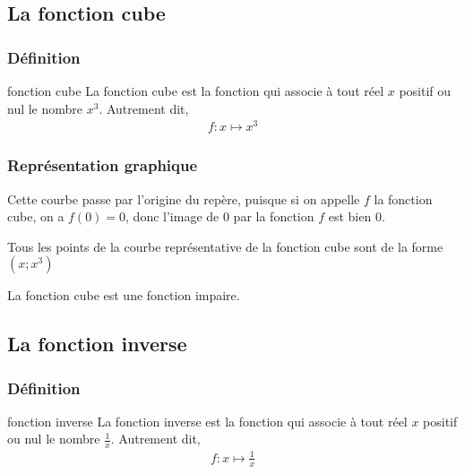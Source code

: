 \documentclass[11pt]{article}
\begin{document}
\subsection{La fonction cube}
\label{sec:org85f80e6}
\subsubsection{Définition}
\label{sec:orgffb8790}
\begin{defi}{fonction cube}
  La fonction cube est la fonction qui associe à tout réel $x$ positif
  ou nul le nombre $x^{3}$. Autrement dit,
  \begin{align*}
    f : x \mapsto x^{3}
  \end{align*}
\end{defi}
\subsubsection{Représentation graphique}
\label{sec:orgdcc5d09}
\begin{center}
\end{center}
\begin{prop}
  Cette courbe passe par l'origine du repère, puisque si on appelle $f$ la
  fonction cube, on a $f(0) = 0$, donc l'image de $0$ par la fonction $f$ est bien $0$.

  Tous les points de la courbe représentative de la fonction cube sont de la forme $(x; x^{3})$

  La fonction cube est une fonction impaire.
\end{prop}

\subsection{La fonction inverse}
\label{sec:orgffc4308}
\subsubsection{Définition}
\label{sec:org3aea505}
\begin{defi}{fonction inverse}
  La fonction inverse est la fonction qui associe à tout réel $x$ positif
  ou nul le nombre $\frac{1}{x}$. Autrement dit,
  \begin{align*}
    f : x \mapsto \frac{1}{x}
  \end{align*}
\end{defi}
\end{document}
